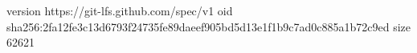version https://git-lfs.github.com/spec/v1
oid sha256:2fa12fe3c13d6793f24735fe89daeef905bd5d13e1f1b9c7ad0c885a1b72c9ed
size 62621
